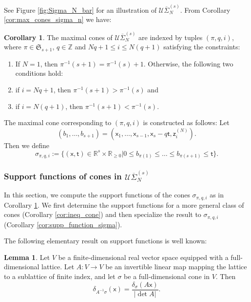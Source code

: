 \documentclass[11pt]{article}
\newcommand{\RR}{\mathbb{R}}
\theoremstyle{definition}
\newtheorem{corollary}[definition]{Corollary}
\newtheorem{lemma}[definition]{Lemma}
\begin{document}
See Figure \ref{fig:Sigma_N_bar} for an illustration of $\mathcal U\overline{\Sigma}_N^{(s)}$. From Corollary \ref{cor:max_cones_sigma_n}
we have:

\begin{corollary}
	\label{cor:max_cones_sigma_n_bar}
	The maximal cones of $\mathcal U\overline{\Sigma}_N^{(s)}$ are indexed by tuples $(\pi,q,i)$, where $\pi\in \mathfrak S_{s+1}$,
	$q\in \mathbb{Z}$ and $Nq+1\le i\le N(q+1)$ satisfying the constraints:
	\begin{enumerate}[label = (\alph*)]
		\item If $N=1$, then $\pi^{-1}(s+1)=\pi^{-1}(s)+1$. Otherwise, the following two conditions hold:
		\item if $i=Nq+1$, then $\pi^{-1}(s+1)>\pi^{-1}(s)$ and
		\item if $i=N(q+1)$, then $\pi^{-1}(s+1)<\pi^{-1}(s)$.
	\end{enumerate}
	The maximal cone corresponding to $(\pi,q,i)$ is constructed as follows:
	Let
    \[
    (b_1,\dots,b_{s+1})=(\mathsf{x}_1,\dots,\mathsf{x}_{s-1},\mathsf{x}_s-q\mathsf{t},\mathsf{z}_i^{(N)}).
    \]
    Then we define
	$$\sigma_{\pi,q,i}:=\{(\mathsf{x},\mathsf{t})\in \RR^s\times\RR_{\ge 0}|0\le b_{\pi(1)}\le\dots\le b_{\pi(s+1)}\le \mathsf{t}\}.$$
\end{corollary}

\subsubsection{Support functions of cones in $\mathcal U\overline{\Sigma}_N^{(s)}$}
\label{sec:supp_functions}

In this section, we compute the support functions of the cones $\sigma_{\pi,q,i}$ as in Corollary \ref{cor:max_cones_sigma_n_bar}.
We first determine the support functions for a more general class of cones (Corollary \ref{cor:ineq_cone}) and then specialize the result to $\sigma_{\pi,q,i}$ (Corollary \ref{cor:supp_function_sigma}).

The following elementary result on support functions is well known:

\begin{lemma}
	\label{lem:delta-pullback-linear}
	Let $V$ be a finite-dimensional real vector space equipped with a full-dimensional lattice.
	Let $A:V\to V$ be an invertible linear map mapping the lattice to a sublattice of finite index, and let $\sigma$ be a full-dimensional cone in $V$. Then
	\[
		\delta_{A^{-1}\sigma}(\mathsf{x})=\frac{\delta_\sigma(A\mathsf{x})}{|\det A|}.
	\]
\end{lemma}
\end{document}
